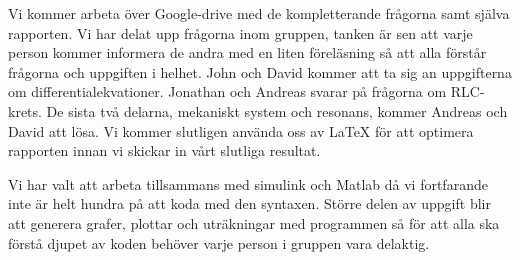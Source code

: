 \documentclass[12pt, a4paper]{report}
\begin{document}
\begin{flushleft}
Vi kommer arbeta över Google-drive med de kompletterande frågorna samt själva rapporten. Vi har delat upp frågorna inom gruppen, tanken är sen att varje person kommer informera de andra med en liten föreläsning så att alla förstår frågorna och uppgiften i helhet. John och David kommer att ta sig an uppgifterna om differentialekvationer. Jonathan och Andreas svarar på frågorna om RLC-krets. De sista två delarna, mekaniskt system och resonans, kommer Andreas och David att lösa.  Vi kommer slutligen använda oss av LaTeX för att optimera rapporten innan vi skickar in vårt slutliga resultat.\newline

Vi har valt att arbeta tillsammans med simulink och Matlab då vi fortfarande inte är helt hundra på att koda med den syntaxen. Större delen av uppgift blir att generera grafer, plottar och uträkningar med programmen så för att alla ska förstå djupet av koden behöver varje person i gruppen vara delaktig. 

\end{flushleft}
\end{document}
